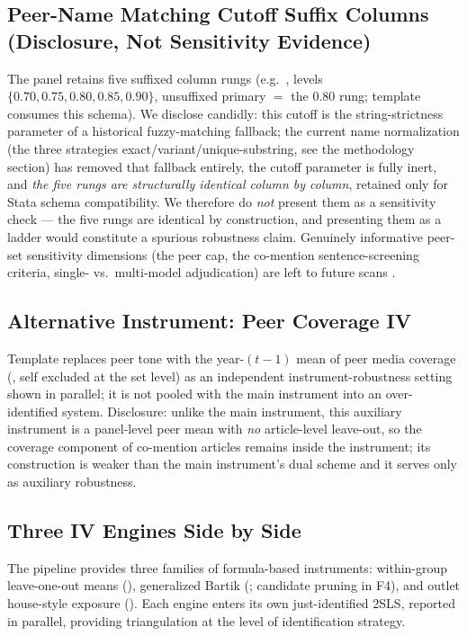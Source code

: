 \subsection{Peer-Name Matching Cutoff Suffix Columns (Disclosure, Not Sensitivity Evidence)}
The panel retains five suffixed column rungs (e.g.\ ,
levels $\{0.70, 0.75, 0.80, 0.85, 0.90\}$, unsuffixed primary $=$ the 0.80 rung; template
 consumes this schema). We disclose candidly: this cutoff is the
string-strictness parameter of a historical  fuzzy-matching fallback; the
current name normalization (the three strategies exact/variant/unique-substring, see the
methodology section) has removed that fallback entirely, the cutoff parameter is fully inert,
and \emph{the five rungs are structurally identical column by column}, retained only for
Stata schema compatibility. We therefore do \emph{not} present them as a sensitivity check
--- the five rungs are identical by construction, and presenting them as a ladder would
constitute a spurious robustness claim. Genuinely informative peer-set sensitivity dimensions
(the peer cap, the co-mention sentence-screening criteria, single- vs.\ multi-model
adjudication) are left to future scans .

\subsection{Alternative Instrument: Peer Coverage IV}
Template  replaces peer tone with the year-$(t-1)$ mean of peer media
coverage (, self excluded at the set level) as an independent
instrument-robustness setting shown in parallel; it is not pooled with the main instrument
into an over-identified system. Disclosure: unlike the main instrument, this auxiliary
instrument is a panel-level peer mean with \emph{no} article-level leave-out, so the coverage
component of co-mention articles remains inside the instrument; its construction is weaker
than the main instrument's dual scheme and it serves only as auxiliary robustness.

\subsection{Three IV Engines Side by Side}
The pipeline provides three families of formula-based instruments: within-group leave-one-out
means (), generalized Bartik (;
candidate pruning in F4), and outlet house-style exposure (). Each engine
enters its own just-identified 2SLS, reported in parallel, providing triangulation at the
level of identification strategy.

